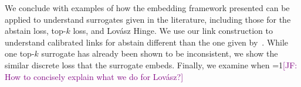 \documentclass[12pt]{article}
\newcommand{\Comments}{1}
\newcommand{\mynote}[2]{\ifnum\Comments=1\textcolor{#1}{#2}\fi}
\newcommand{\jessie}[1]{\mynote{purple}{[JF: #1]}}
\newcommand{\reals}{\mathbb{R}}
\begin{document}
We conclude with examples of how the embedding framework presented can be applied to understand surrogates given in the literature, including those for the abstain loss, top-$k$ loss, and Lov\'asz Hinge.
We use our link construction to understand calibrated links for abstain different than the one given by~\citet{ramaswamy2018consistent}.
While one top-$k$ surrogate has already been shown to be inconsistent, we show the similar discrete loss that the surrogate embeds.
Finally, we examine when \jessie{How to concisely explain what we do for Lov\'asz?}

%
%

\end{document}
